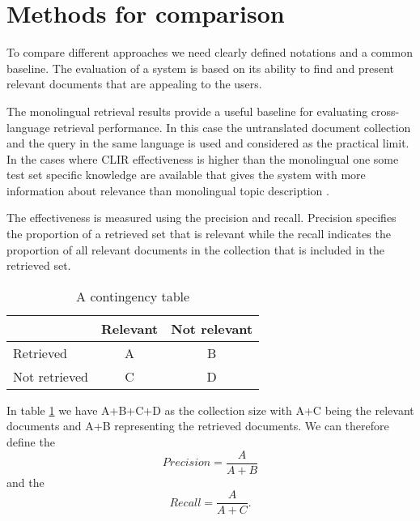 \documentclass[journal]{IEEEtran}
\begin{document}
\section{Methods for comparison}
To compare different approaches we need clearly defined notations and a common baseline.
The evaluation of a system is based on its ability to find and present relevant documents that are appealing to the users.

The monolingual retrieval results provide a useful baseline for evaluating cross-language retrieval performance.
In this case the untranslated document collection and the query in the same language is used and considered as the practical limit.
In the cases where CLIR effectiveness is higher than the monolingual one some test set specific knowledge are available that gives the system with more information about relevance than monolingual topic description \cite{xu00}.

The effectiveness is measured using the precision and recall.
Precision specifies the proportion of a retrieved set that is relevant while the recall indicates the proportion of all relevant documents in the collection that is included in the retrieved set.

\begin{table}[h]
\caption{A contingency table}
\label{contTable}
\begin{center}
\begin{tabular}{ | l | c | c | }
	\hline
				& Relevant	& Not relevant	\\ \hline
	Retrieved		& A		& B			\\ \hline
	Not retrieved	& C		& D			\\
	\hline
\end{tabular}
\end{center}
\end{table}

In table \ref{contTable} we have A+B+C+D as the collection size with A+C being the relevant documents and A+B representing the retrieved documents.
We can therefore define the
\begin{equation}
\label{precision}
Precision = \frac{A}{A+B}
\end{equation}
and the
\begin{equation}
\label{recall}
Recall = \frac{A}{A+C}.
\end{equation}
\end{document}
